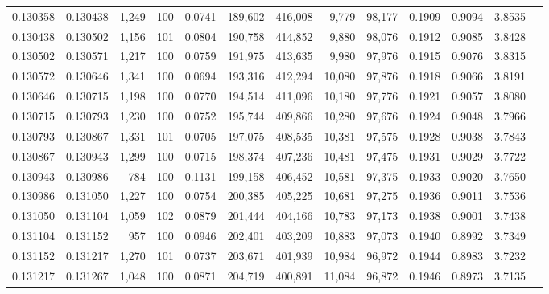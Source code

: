 \begin{tabular}{rrrrrrrrrrrrr}
0.130358 & 0.130438 & 1,249 & 100 &                                     0.0741 & 189,602 & 416,008 &   9,779 &  98,177 & 0.1909 & 0.9094 & 3.8535 \\
0.130438 & 0.130502 & 1,156 & 101 &                                     0.0804 & 190,758 & 414,852 &   9,880 &  98,076 & 0.1912 & 0.9085 & 3.8428 \\
0.130502 & 0.130571 & 1,217 & 100 &                                     0.0759 & 191,975 & 413,635 &   9,980 &  97,976 & 0.1915 & 0.9076 & 3.8315 \\
0.130572 & 0.130646 & 1,341 & 100 &                                     0.0694 & 193,316 & 412,294 &  10,080 &  97,876 & 0.1918 & 0.9066 & 3.8191 \\
0.130646 & 0.130715 & 1,198 & 100 &                                     0.0770 & 194,514 & 411,096 &  10,180 &  97,776 & 0.1921 & 0.9057 & 3.8080 \\
0.130715 & 0.130793 & 1,230 & 100 &                                     0.0752 & 195,744 & 409,866 &  10,280 &  97,676 & 0.1924 & 0.9048 & 3.7966 \\
0.130793 & 0.130867 & 1,331 & 101 &                                     0.0705 & 197,075 & 408,535 &  10,381 &  97,575 & 0.1928 & 0.9038 & 3.7843 \\
0.130867 & 0.130943 & 1,299 & 100 &                                     0.0715 & 198,374 & 407,236 &  10,481 &  97,475 & 0.1931 & 0.9029 & 3.7722 \\
0.130943 & 0.130986 &   784 & 100 &                                     0.1131 & 199,158 & 406,452 &  10,581 &  97,375 & 0.1933 & 0.9020 & 3.7650 \\
0.130986 & 0.131050 & 1,227 & 100 &                                     0.0754 & 200,385 & 405,225 &  10,681 &  97,275 & 0.1936 & 0.9011 & 3.7536 \\
0.131050 & 0.131104 & 1,059 & 102 &                                     0.0879 & 201,444 & 404,166 &  10,783 &  97,173 & 0.1938 & 0.9001 & 3.7438 \\
0.131104 & 0.131152 &   957 & 100 &                                     0.0946 & 202,401 & 403,209 &  10,883 &  97,073 & 0.1940 & 0.8992 & 3.7349 \\
0.131152 & 0.131217 & 1,270 & 101 &                                     0.0737 & 203,671 & 401,939 &  10,984 &  96,972 & 0.1944 & 0.8983 & 3.7232 \\
0.131217 & 0.131267 & 1,048 & 100 &                                     0.0871 & 204,719 & 400,891 &  11,084 &  96,872 & 0.1946 & 0.8973 & 3.7135 \\

\end{tabular}
